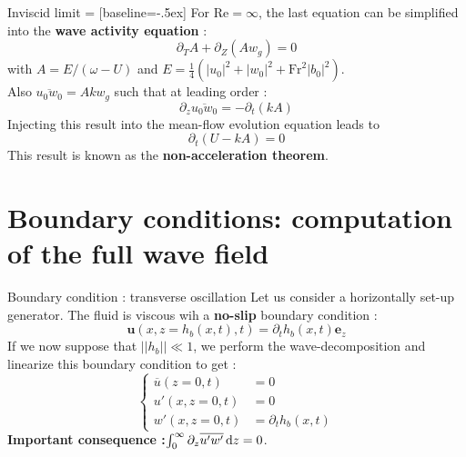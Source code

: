 \documentclass[10pt]{beamer}
\begin{document}
\begin{frame}[fragile]{Inviscid limit}
   = [baseline=-.5ex]
  For $\mathrm{Re}=\infty$, the last equation can be simplified into the \textbf{wave activity equation} :
  \begin{equation*}
  	\partial_{T}A+\partial_{Z}\left(A w_{g}\right)=0
  \end{equation*}
  with $A=E/\left(\omega-U\right)$ and $E=\frac{1}{4}\left(\left\lvert u_{0}\right\rvert^{2}+\left\lvert w_{0}\right\rvert^{2}+\mathrm{Fr}^{2}\left\lvert b_{0}\right\rvert^{2}\right)$. \\
  Also $\overline{u_{0}w_{0}}=Akw_{g}$ such that at leading order :
  \begin{equation*}
  	\partial_{z}\overline{u_{0}w_{0}}=-\partial_{t}\left(kA\right)
  \end{equation*}
  Injecting this result into the mean\--flow evolution equation leads to 
  \begin{equation*}
  	\partial_{t}\left(U-kA\right)=0
  \end{equation*}
  This result is known as the \textbf{non-acceleration theorem}.
\end{frame}

\section{Boundary conditions: computation of the full wave field}

\begin{frame}{Boundary condition : transverse oscillation}
	Let us consider a horizontally set-up generator. The fluid is viscous wih a \textbf{no\--slip} boundary condition :
	\begin{equation*}
		\mathbf{u}\left(x,z=h_{b}\left(x,t\right),t\right)=\partial_{t}h_{b}\left(x,t\right)\mathbf{e}_{z}
	\end{equation*}
	If we now suppose that $\left\lvert\left\lvert h_{b}\right\rvert\right\rvert\ll1$, we perform the wave\--decomposition and linearize this boundary condition to get :
	\begin{equation*}
		\begin{cases}
			\overline{u}\left(z=0,t\right)&=0\\
			u'\left(x,z=0,t\right)&=0\\
			w'\left(x,z=0,t\right)&=\partial_{t}h_{b}\left(x,t\right)
		\end{cases}
	\end{equation*}
	\textbf{Important consequence :}$\intop_{0}^{\infty}\partial_{z}\overline{u'w'}\,\mathrm{d}z=0$.
\end{frame}
\end{document}
